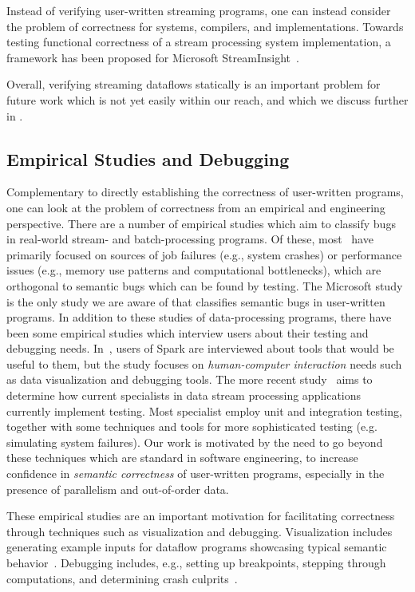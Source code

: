 Instead of verifying user-written streaming programs, one can instead consider the problem of correctness for systems, compilers, and implementations.
Towards testing functional correctness of a stream processing system implementation, a framework has been proposed for Microsoft StreamInsight~\cite{raizman2010extensible}.

Overall, verifying streaming dataflows statically is an important problem for future work which is not yet easily within our reach, and which we discuss further in .

\subsection{Empirical Studies and Debugging}

Complementary to directly establishing the correctness of user-written programs, one can look at the problem of correctness from an empirical and engineering perspective.
There are a number of empirical studies which aim to classify bugs in real-world stream- and batch-processing programs. Of these, most~\cite{schroeder2009large, kavulya2010analysis, li2013characteristic, zhou2015empirical} have primarily focused on sources of job failures (e.g., system crashes) or performance issues (e.g., memory use patterns and computational bottlenecks), which are orthogonal to semantic bugs which can be found by testing. The Microsoft study~\cite{xiao2014nondeterminism} is the only study we are aware of that classifies semantic bugs in user-written programs.
In addition to these studies of data-processing programs, there have been some empirical studies which interview users about their testing and debugging needs. In~\cite{fisher2012interactions}, users of Spark are interviewed about tools that would be useful to them, but the study focuses on \emph{human-computer interaction} needs such as data visualization and debugging tools. The more recent study~\cite{vianna2019exploratory} aims to determine how current specialists in data stream processing applications currently implement testing. Most specialist employ unit and integration testing, together with some techniques and tools for more sophisticated testing (e.g. simulating system failures). Our work is motivated by the need to go beyond these techniques which are standard in software engineering, to increase confidence in \emph{semantic correctness} of user-written programs, especially in the presence of parallelism and out-of-order data.

These empirical studies are an important motivation for facilitating correctness through techniques such as visualization and debugging.
Visualization includes generating example inputs for dataflow programs showcasing typical semantic behavior~\cite{olston2009generating}. Debugging includes, e.g., setting up breakpoints, stepping through computations, and determining crash culprits~\cite{gulzar2016bigdebug,olston2011inspector}.

